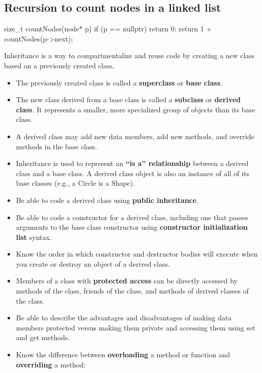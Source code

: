 \documentclass{report}
\begin{document}
    \bigbreak \noindent 
    \subsection{Recursion to count nodes in a linked list}
    \bigbreak \noindent 
    \begin{cppcode}
        size_t countNodes(node* p) {
            if (p == nullptr) {
                return 0;
            }
            return 1 + countNodes(p->next);
        }
    \end{cppcode}

    \pagebreak 
    \bigbreak \noindent 
    Inheritance is a way to compartmentalize and reuse code by creating a new class based on a previously created class.
    \begin{itemize}
        \item The previously created class is called a \textbf{superclass} or \textbf{base class}.
        \item The new class derived from a base class is called a \textbf{subclass} or \textbf{derived class}. It represents a smaller, more specialized group of objects than its base class.
        \item A derived class may add new data members, add new methods, and override methods in the base class.
        \item Inheritance is used to represent an \textbf{“is a” relationship} between a derived class and a base class. A derived class object is also an instance of all of its base classes (e.g., a Circle is a Shape).
        \item Be able to code a derived class using \textbf{public inheritance}.
        \item Be able to code a constructor for a derived class, including one that passes arguments to the base class constructor using \textbf{constructor initialization list} syntax.
        \item Know the order in which constructor and destructor bodies will execute when you create or destroy an object of a derived class.
        \item Members of a class with \textbf{protected access} can be directly accessed by methods of the class, friends of the class, and methods of derived classes of the class.
        \item Be able to describe the advantages and disadvantages of making data members protected versus making them private and accessing them using set and get methods.
        \item Know the difference between \textbf{overloading} a method or function and \textbf{overriding} a method:

\end{itemize}
\end{document}

